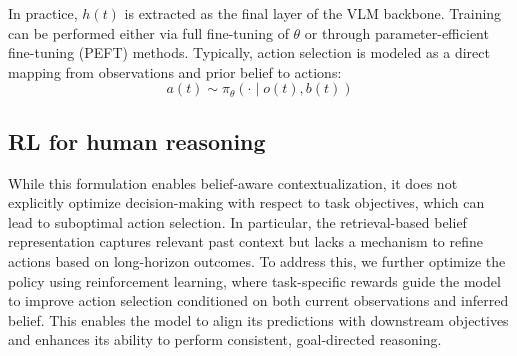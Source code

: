 \documentclass[letterpaper, 10 pt, conference]{ieeeconf}  %
\begin{document}
In practice, $h(t)$ is extracted as the final layer of the VLM backbone. 
 Training can be performed either via full fine-tuning of $\theta$ or through parameter-efficient fine-tuning (PEFT) methods. Typically, action selection is modeled as a direct mapping from observations and prior belief to actions:
\begin{equation}
a(t) \sim \pi_\theta(\cdot \mid o(t), b(t))
\end{equation}



 




\subsection{RL for human reasoning}

While this formulation enables belief-aware contextualization, it does not explicitly optimize decision-making with respect to task objectives, which can lead to suboptimal action selection. In particular, the retrieval-based belief representation captures relevant past context but lacks a mechanism to refine actions based on long-horizon outcomes. To address this, we further optimize the policy using reinforcement learning, where task-specific rewards guide the model to improve action selection conditioned on both current observations and inferred belief. This enables the model to align its predictions with downstream objectives and enhances its ability to perform consistent, goal-directed reasoning.
\end{document}
